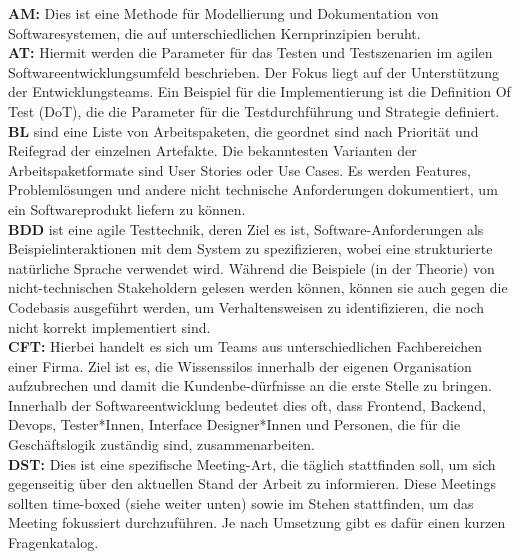 \textbf{AM:} Dies ist eine Methode für Modellierung und Dokumentation von Softwaresystemen,
die auf unterschiedlichen Kernprinzipien beruht.\cite{Ambler2010-te} \\

\textbf{AT:} Hiermit werden die Parameter für das Testen und Testszenarien im agilen Softwareentwicklungsumfeld beschrieben.
Der Fokus liegt auf der Unterstützung der Entwicklungsteams.  Ein Beispiel für die Implementierung ist die Definition Of Test (DoT),
die die Parameter für die Testdurchführung und Strategie definiert. \cite{Crispin2009} \\

\textbf{BL} sind eine Liste von Arbeitspaketen, die geordnet sind nach Priorität und Reifegrad der einzelnen Artefakte.
Die bekanntesten Varianten der Arbeitspaketformate sind User Stories oder Use Cases.
Es werden Features, Problemlösungen und andere nicht technische Anforderungen dokumentiert,
um ein Softwareprodukt liefern zu können.\cite{Svensson2019-pq} \\

\textbf{BDD} ist eine agile Testtechnik, deren Ziel es ist, Software-Anforderungen als Beispielinteraktionen mit dem System zu spezifizieren,
wobei eine strukturierte natürliche Sprache verwendet wird. Während die Beispiele (in der Theorie)
von nicht-technischen Stakeholdern gelesen werden können, können sie auch gegen die Codebasis ausgeführt werden,
um Verhaltensweisen zu identifizieren, die noch nicht korrekt implementiert sind. \cite{Binamungu2020-wt} \\

\textbf{CFT:} Hierbei handelt es sich um Teams aus unterschiedlichen Fachbereichen einer Firma.
Ziel ist es, die Wissenssilos innerhalb der eigenen Organisation aufzubrechen und damit die Kundenbe-dürfnisse an die erste Stelle zu bringen.
Innerhalb der Softwareentwicklung bedeutet dies oft, dass Frontend, Backend, Devops, Tester*Innen,
Interface Designer*Innen und Personen, die für die Geschäftslogik zuständig sind, zusammenarbeiten. \cite{McDonough2000-fi} \\

\textbf{DST:} Dies ist eine spezifische Meeting-Art, die täglich stattfinden soll,
um sich gegenseitig über den aktuellen Stand der Arbeit zu informieren.
Diese Meetings sollten time-boxed (siehe weiter unten) sowie im Stehen stattfinden,
um das Meeting fokussiert durchzuführen. Je nach Umsetzung gibt es dafür einen kurzen Fragenkatalog. \cite{Stray2016-me} \\

